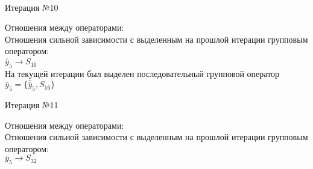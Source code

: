\documentclass[a4paper,14pt]{article}
\begin{document}
\\
\begin{center} Итерация №10 \end{center}
Отношения между операторами: \\
Отношения сильной зависимости с выделенным на прошлой итерации групповым оператором: \\ \newline
\begin{math}
    \bar{\bar{y}}_{5} \rightarrow S_{16}
\end{math}\\ \newline
%
На текущей итерации был выделен последовательный групповой оператор $\bar{y}_{5} = \{\bar{\bar{y}}_{5}, S_{16}\}$
\\
\begin{center} Итерация №11 \end{center}
Отношения между операторами: \\
Отношения сильной зависимости с выделенным на прошлой итерации групповым оператором: \\ \newline
\begin{math}
    \bar{y}_{5} \rightarrow S_{32}
\end{math} \\ \\ \\ 
%
\end{document}
